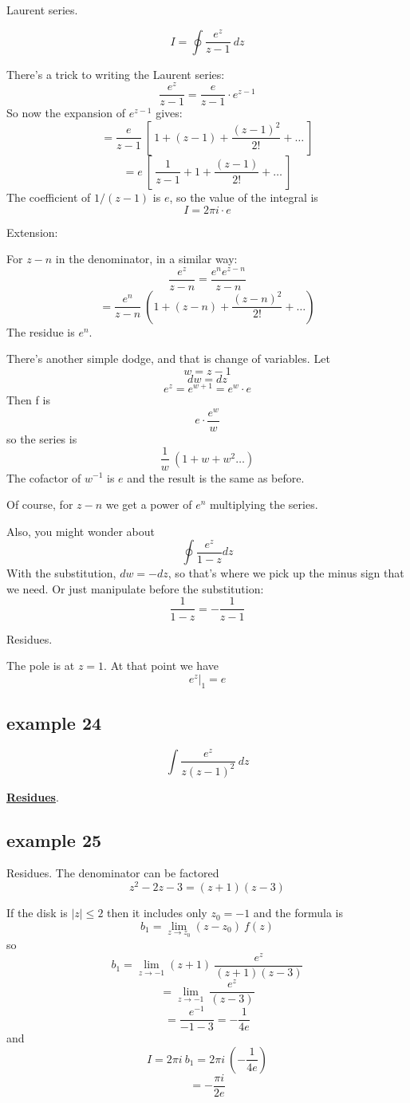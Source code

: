 \documentclass[11pt, oneside]{article}
\begin{document}
Laurent series.

\[ I = \oint \frac{e^z}{z - 1} \ dz \]

There's a trick to writing the Laurent series:
\[ \frac{e^z}{z - 1} = \frac{e}{z - 1} \cdot e^{z - 1} \]
So now the expansion of $e^{z -1}$ gives:
\[ = \frac{e}{z - 1} \ [ \ 1 + (z - 1) + \frac{(z-1)^2}{2!} + \dots \ ]  \]
\[ = e \ [ \ \frac{1}{z - 1} + 1 + \frac{(z-1)}{2!} + \dots \ ]  \]
The coefficient of $1/(z-1)$ is $e$, so the value of the integral is
\[ I = 2 \pi i \cdot e \]

Extension:

For $z - n$ in the denominator, in a similar way:
\[ \frac{e^z}{z - n} = \frac{e^n e^{z -n}}{z - n} \]
\[ = \frac{e^n}{z - n} \ ( 1 + (z - n) + \frac{(z - n)^2}{2!} + \dots ) \]
The residue is $e^n$.

There's another simple dodge, and that is change of variables.  Let
\[ w = z - 1\]
\[ dw = dz \]
\[ e^z = e^{w + 1} = e^w \cdot e \]
Then f is
\[ e \cdot \frac{e^w}{w} \]
so the series is 
\[ \frac{1}{w} \ (1 + w + w^2 \dots ) \]
The cofactor of $w^{-1}$ is $e$ and the result is the same as before.

Of course, for $z - n$ we get a power of $e^n$ multiplying the series.

Also, you might wonder about 
\[ \oint \frac{e^z}{1 - z} dz \]
With the substitution, $dw = - dz$, so that's where we pick up the minus sign that we need.  Or just manipulate before the substitution:
\[ \frac{1}{1 - z} = - \frac{1}{z - 1} \]

Residues.

The pole is at $z = 1$.  At that point we have
\[ e^z \bigg |_1 = e \]

\subsection*{example 24}
\[ \int \frac{e^z}{z(z - 1)^2} \ dz \]

\hyperref[sec:ex24R]{\textbf{Residues}}.

\subsection*{example 25}

Residues.  The denominator can be factored
\[ z^2 - 2z - 3 = (z + 1)(z - 3) \]

If the disk is $|z| \le 2$ then it includes only $z_0 = -1$ and the formula is
\[ b_1 = \lim_{z \rightarrow z_0} (z-z_0) \ f(z)  \]
so
\[ b_1 = \lim_{z \rightarrow -1} (z+1) \ \frac{e^z}{(z + 1)(z - 3)}  \]
\[ = \lim_{z \rightarrow -1} \ \frac{e^z}{(z - 3)}  \]
\[ = \frac{e^{-1}}{-1 - 3} = - \frac{1}{4 e} \]
and
\[ I = 2 \pi i \ b_1 = 2 \pi i \ (- \frac{1}{4 e}) \]
\[ = - \frac{\pi i}{2 e} \]
\end{document}
